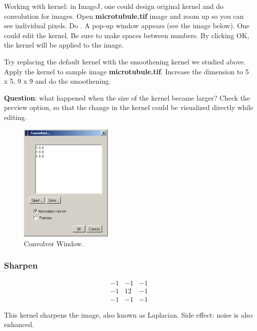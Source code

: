 \begin{indentexercise}{1}
 Working with kernel: in ImageJ, one could
design original kernel and do convolution for images.
Open \textbf{microtubule.tif} image and
zoom up so you can see individual pixels. Do . A pop-up window
appears (see the image below). One could edit the kernel. Be sure to
make spaces between numbers. By clicking OK, the kernel will be applied
to the image. 

Try replacing the default kernel with the smoothening kernel we studied
above. Apply the kernel to sample image
\textbf{microtubule.tif}. Increase the
dimension to 5 x 5, 9 x 9 and do the smoothening. 

\textbf{Question}: what happened when the size of the kernel became
larger? Check the preview option, so that the change in the kernel
could be visualized directly while editing.

\begin{figure}[htbp]
\begin{center}
\includegraphics[width=4.471cm]{fig/CMCIBasicCourse201102-img57.png}
\caption{ Convolver Window.}
\label{fig:img57}
\end{center}
\end{figure} 

\end{indentexercise}

\subsubsection{Sharpen }

\[
 \begin{matrix}
  -1 & -1 & -1 \\
  -1 & 12 & -1 \\
  -1 & -1 & -1
 \end{matrix}
\]

This kernel sharpens the image, also known as Laplacian. Side effect:
noise is also enhanced. 


